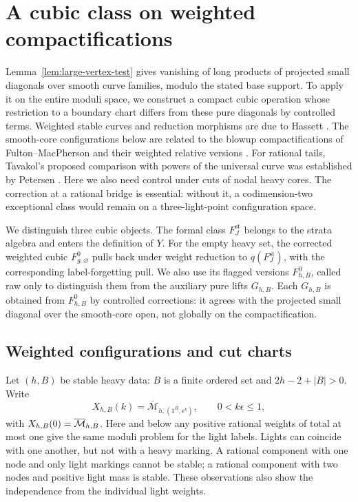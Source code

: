 \section{A cubic class on weighted compactifications}
\label{sec:compactification}

Lemma~\ref{lem:large-vertex-test} gives vanishing of long products of
projected small diagonals over smooth curve families, modulo the stated
base support.  To apply it on the entire moduli space, we construct a
compact cubic operation whose restriction to a boundary chart differs
from these pure diagonals by controlled terms.  Weighted stable curves
and reduction morphisms are due to Hassett
\cite{Hassett}. The smooth-core configurations below are related to the
blowup compactifications of Fulton--MacPherson \cite{FultonMacPherson}
and their weighted relative versions \cite{Routis}. For rational tails,
Tavakol's proposed comparison with powers of the universal curve
\cite{TavakolRT} was established by Petersen
\cite[Proposition~2.11]{PetersenWonderful}.
Here we also need control under cuts of nodal heavy cores.
The correction at a rational bridge is essential: without it, a codimension-two exceptional class would
remain on a three-light-point configuration space.

We distinguish three cubic objects.  The formal class
$F_J^{\mathrm{st}}$ belongs to the strata algebra and enters the
definition of $Y$.  For the empty heavy set, the corrected weighted
cubic $F^0_{g,\varnothing}$ pulls back under weight reduction to
$q(F_J^{\mathrm{st}})$, with the corresponding label-forgetting pull.
We also use its flagged versions $F^0_{h,B}$, called raw only to
distinguish them from the auxiliary pure lifts $G_{h,B}$.
Each $G_{h,B}$ is obtained from $F^0_{h,B}$ by controlled corrections:
it agrees with the
projected small diagonal over the smooth-core open, not globally
on the compactification.

\subsection{Weighted configurations and cut charts}

Let $(h,B)$ be stable heavy data: $B$ is a finite ordered set and
$2h-2+|B|>0$.  Write
\[
 X_{h,B}(k)=
 \overline{\mathcal M}_{h,(1^B,\epsilon^k)},
 \qquad 0<k\epsilon\leq1,
\]
with $X_{h,B}(0)=\overline{\mathcal M}_{h,B}$.  Here and below any positive rational
weights of total at most one give the same moduli problem for the light
labels.  Lights can coincide with one another, but not with a heavy
marking.  A rational component with one node and only light markings
cannot be stable; a rational component with two nodes and positive light
mass is stable.  These observations also show the independence from the
individual light weights.

